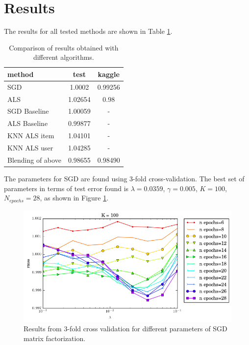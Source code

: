 \section{Results}

The results for all tested methods are shown in Table \ref{tab:results}.

\begin{table}
  \centering
\begin{tabular}{|l|c|c|}
  \hline
  method & test & kaggle\\
  \hline
  SGD & 1.0002 & 0.99256 \\
  ALS & 1.02654 & 0.98 \\
  SGD Baseline & 1.00059 & -\\
  ALS Baseline & 0.99877 & -\\
  KNN ALS item & 1.04101 & -\\
  KNN ALS user & 1.04285 & -\\
  Blending of above & 0.98655 & 0.98490\\
  \hline
\end{tabular}
  \caption{Comparison of results obtained with different algorithms.}
  \label{tab:results}
\end{table}

The parameters for SGD are found using 3-fold cross-validation.
The best set of parameters in terms of test error found
is $\lambda=0.0359$, $\gamma=0.005$, $K=100$,
$N_{epochs} = 28$, as shown in Figure \ref{fig:sgd}.

\begin{figure}[htbp]
  \centering
  \includegraphics[width=.9\columnwidth]{figures/lambda_rmse_28_0_005.png}
  \vspace{-3mm}
  \caption{Results from 3-fold cross validation for different parameters of SGD
  matrix factorization.}
  \label{fig:sgd}
\end{figure}


